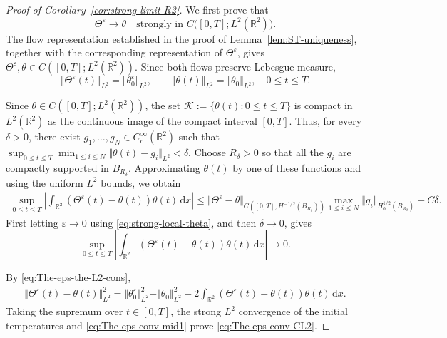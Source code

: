 \documentclass[reqno,11pt,a4paper]{amsart}
\newcommand{\dd}{\mathrm{d}}
\begin{document}
\begin{proof}[Proof of Corollary~\ref{cor:strong-limit-R2}]
We first prove that
\begin{equation}\label{eq:The-eps-conv-CL2}
  \Theta^\varepsilon\longrightarrow\theta
  \quad\text{strongly in }
  C\bigl([0,T];L^2(\mathbb R^2)\bigr).
\end{equation}
The flow representation established in the proof of
Lemma~\ref{lem:ST-uniqueness}, together with the
corresponding representation of $\Theta^\varepsilon$,
gives
$\Theta^\varepsilon,\theta\in C([0,T];L^2(\mathbb R^2))$.
Since both flows preserve Lebesgue measure,
\begin{equation}\label{eq:The-eps-the-L2-cons}
  \Vert \Theta^\varepsilon(t)\Vert _{L^2}
  =\Vert \theta_0^\varepsilon\Vert _{L^2},
  \qquad
  \Vert \theta(t)\Vert _{L^2}=\Vert \theta_0\Vert _{L^2},
  \quad 0\leq t\leq T.
\end{equation}

Since $\theta\in C([0,T];L^2(\mathbb R^2))$,
the set
$\mathcal K:=\{\theta(t):0\leq t\leq T\}$
is compact in $L^2(\mathbb R^2)$
as the continuous image of the compact interval $[0,T]$.
Thus, for every $\delta>0$, there exist
$g_1,\ldots,g_N\in C_c^\infty(\mathbb R^2)$ such that
$\sup_{0\leq t\leq T}\min_{1\leq i\leq N}\Vert \theta(t)-g_i\Vert _{L^2}<\delta$.
Choose $R_\delta>0$ so that all the $g_i$
are compactly supported in $B_{R_\delta}$.
Approximating $\theta(t)$ by one of these functions
and using the uniform $L^2$ bounds, we obtain
\begin{align*}
  \sup_{0\leq t\leq T}
  \left|
    \int_{\mathbb R^2}
    (\Theta^\varepsilon(t)-\theta(t))\theta(t)\,\dd x
  \right|
  \leq
  \Vert \Theta^\varepsilon-\theta\Vert _
    {C([0,T];H^{-1/2}(B_{R_\delta}))}
  \max_{1\leq i\leq N}
  \Vert g_i\Vert _{H_0^{1/2}(B_{R_\delta})}
  +C\delta.
\end{align*}
First letting $\varepsilon\to0$ using
\eqref{eq:strong-local-theta}, and then
$\delta\rightarrow0$, gives
\begin{equation}\label{eq:The-eps-conv-mid1}
  \sup_{0\leq t\leq T}
  \left|
    \int_{\mathbb R^2}
    (\Theta^\varepsilon(t)-\theta(t))\theta(t)\,\dd x
  \right|
  \longrightarrow0.
\end{equation}

By \eqref{eq:The-eps-the-L2-cons},
\begin{align*}
  \Vert \Theta^\varepsilon(t)-\theta(t)\Vert _{L^2}^2
  =
  \Vert \theta_0^\varepsilon\Vert _{L^2}^2
  -\Vert \theta_0\Vert _{L^2}^2
  -2\int_{\mathbb R^2}
  (\Theta^\varepsilon(t)-\theta(t))\theta(t)\,\dd x.
\end{align*}
Taking the supremum over $t\in[0,T]$,
the strong $L^2$ convergence of the initial temperatures
and \eqref{eq:The-eps-conv-mid1}
prove \eqref{eq:The-eps-conv-CL2}.


\end{proof}
\end{document}
